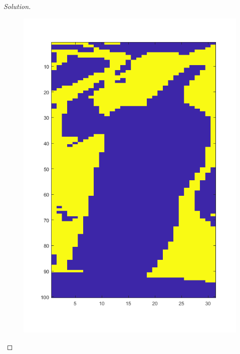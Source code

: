 \documentclass[10pt]{article}
\begin{document}
\begin{proof}[Solution]
\begin{figure}[H]
\centering
\begin{minipage}{.5\textwidth}
  \centering
  \includegraphics[width=\linewidth]{pepper_sigma_1}
  \label{fig:test1}
\end{minipage}%
\begin{minipage}{.5\textwidth}
  \centering

\end{minipage}
\end{figure}
\end{proof}
\end{document}
